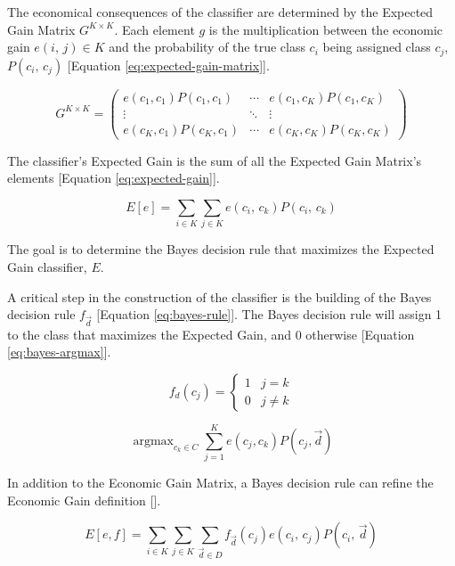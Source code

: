 \documentclass[letterpaper, conference]{IEEEtran}
\DeclareMathOperator*{\argmax}{argmax}
\begin{document}
The economical consequences of the classifier are determined by the Expected Gain Matrix $G^{K \times K}$. Each element $g$ is the multiplication between the economic gain $e(i,\, j) \in K$ and the probability of the true class $c_i$ being assigned class $c_j$, $P(c_i,\, c_j)$ [Equation \ref{eq:expected-gain-matrix}].

\begin{equation}\label{eq:expected-gain-matrix}
  G^{K \times K} = \begin{pmatrix}
    e(c_1,c_1)P(c_1,c_1) & \cdots & e(c_1,c_K)P(c_1,c_K) \\
                \vdots   & \ddots &    \vdots   \\
    e(c_K,c_1)P(c_K,c_1) & \cdots & e(c_K,c_K)P(c_K,c_K)
  \end{pmatrix}
\end{equation}

The classifier's Expected Gain is the sum of all the Expected Gain Matrix's elements [Equation \ref{eq:expected-gain}].

\begin{equation}\label{eq:expected-gain}
  E[e] = \sum_{i \in K} \sum_{j \in K}e(c_i,\,c_k)\mathbin{}P(c_i,\,c_k)
\end{equation}

The goal is to determine the Bayes decision rule that maximizes the Expected Gain classifier, $E$.

A critical step in the construction of the classifier is the building of the Bayes decision rule $f_{\vec{d}}$ [Equation \ref{eq:bayes-rule}]. The Bayes decision rule will assign 1 to the class that maximizes the Expected Gain, and 0 otherwise [Equation \ref{eq:bayes-argmax}].

\begin{equation}\label{eq:bayes-rule}
  f_d(c_j) =
  \begin{cases}
  1 & j = k \\
  0 & j \neq k
  \end{cases}
\end{equation}

\begin{equation}\label{eq:bayes-argmax}
  \argmax_{c_k \in C} \sum_{j = 1}^{K} e(c_j, c_k)\mathbin{}P(c_j, \vec{d})
\end{equation}

In addition to the Economic Gain Matrix, a Bayes decision rule can refine the Economic Gain definition [\label{eq:bayes-expected-gain}].

\begin{equation}\label{eq:bayes-expected-gain}
  E[e, f] = \sum_{i \in K} \sum_{j \in K}\sum_{\vec{d} \in D}f_{\vec{d}}(c_j)\mathbin{}e(c_i,\, c_j)\mathbin{}P(c_i,\,\vec{d})
\end{equation}
\end{document}
